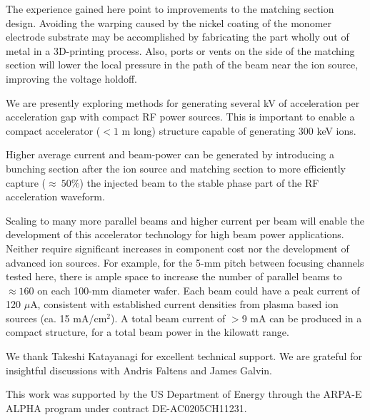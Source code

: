 \documentclass[%
 aip,
rsi,%
 amsmath,amssymb,
 reprint,%
]{revtex4-1}
\begin{document}
The experience gained here point to improvements to the matching section design. Avoiding the warping caused by the nickel coating of the monomer electrode substrate may be accomplished by fabricating the part wholly out of metal in a 3D-printing process. Also, ports or vents on the side of the matching section will lower the local pressure in the path of the beam near the ion source, improving the voltage holdoff. 

We are presently exploring methods for generating several kV of acceleration per acceleration gap with compact RF power sources.  This is important to enable a compact accelerator ($<1$ m long) structure capable of generating 300 keV ions. 

Higher average current and beam-power can be generated by introducing a bunching section \cite{Wangler2008} after the ion source and matching section to more efficiently capture ($ \approx~50\%$) the injected beam to the stable phase part of the RF acceleration waveform. 

Scaling to many more parallel beams and higher current per beam will enable the development of this accelerator technology for high beam power  applications. Neither require significant increases in component cost nor the development of advanced ion sources.
For example, for the 5-mm pitch between focusing channels tested here, there is ample space to increase the number of parallel beams to $\approx 160$ on each 100-mm diameter wafer.  Each beam could have a peak current of 120 $\mu$A, consistent with established current densities from plasma based ion sources (ca. 15 mA/cm$^2$). A total beam current of $>$9 mA can be produced in a compact structure, for a total beam power in the kilowatt range.

\begin{acknowledgments}
We thank Takeshi Katayanagi for excellent technical support.  We are grateful for insightful discussions with Andris Faltens and James Galvin.

This work was supported by the
US Department of Energy through the ARPA-E ALPHA
program under contract DE-AC0205CH11231.
\end{acknowledgments}


\end{document}

